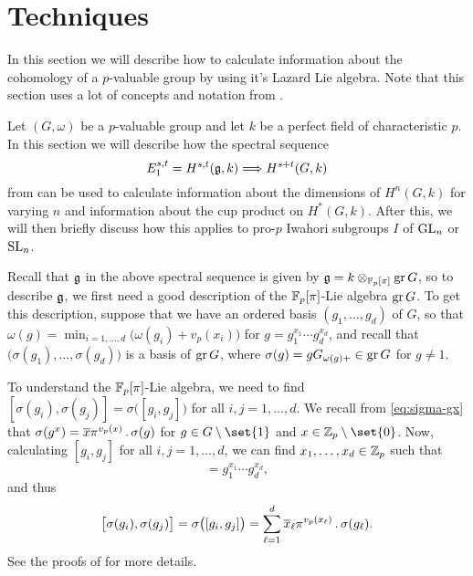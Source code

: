 \section{Techniques}%
\label{sec:tech-iwa}

In this section we will describe how to calculate information about the cohomology of a $p$-valuable group by using it's Lazard Lie algebra. Note that this section uses a lot of concepts and notation from .

Let $(G, \omega)$ be a $p$-valuable group and let $k$ be a perfect field of characteristic $p$. In this section we will describe how the spectral sequence
\begin{equation}\label{eq:spec-sec-tech}
  E_{1}^{s,t} = H^{s,t}(\mathfrak{g}, k) \Longrightarrow H^{s+t}(G, k)
\end{equation}
from \cite[§6.1]{Sor} can be used to calculate information about the dimensions of $H^{n}(G,k)$ for varying $n$ and information about the cup product on $H^{*}(G,k)$. After this, we will then briefly discuss how this applies to pro-$p$ Iwahori subgroups $I$ of $\operatorname{GL}_{n}$ or $\operatorname{SL}_{n}$.

Recall that $\mathfrak{g}$ in the above spectral sequence is given by $\mathfrak{g} = k \otimes_{\mathbb{F}_{p}[\pi]} \operatorname{gr} G$, so to describe $\mathfrak{g}$, we first need a good description of the $\mathbb{F}_{p}[\pi]$-Lie algebra $\operatorname{gr} G$. To get this description, suppose that we have an ordered basis $(g_{1},\dotsc,g_{d})$ of $G$, so that $\omega(g) = \min_{i = 1,\dotsc,d} \bigl( \omega(g_{i}) + v_{p}(x_{i}) \bigr)$ for $g = g_{1}^{x_{1}} \dotsb g_{d}^{x_{d}}$, and recall that $\bigl( \sigma(g_{1}),\dotsc,\sigma(g_{d}) \bigr)$ is a basis of $\operatorname{gr} G$, where $\sigma(g) = gG_{\omega(g)+} \in \operatorname{gr} G$ for $g \neq 1$.

To understand the $\mathbb{F}_{p}[\pi]$-Lie algebra, we need to find $[\sigma(g_{i}),\sigma(g_{j})] = \sigma\bigl( [g_{i},g_{j}] \bigr)$ for all $i,j = 1,\dotsc,d$. We recall from \eqref{eq:sigma-gx} that $\sigma(g^{x}) = \overline{x}\pi^{v_{p}(x)} \,.\, \sigma(g)$ for $g \in G \setminus\set{1}$ and $x \in \Z_{p}\setminus\set{0}$. Now, calculating $[g_{i},g_{j}]$ for all $i,j = 1,\dotsc,d$, we can find $x_{1},\dotsc,x_{d} \in \mathbb{Z}_{p}$ such that
\begin{equation*}
  [g_{i},g_{j}] = g_{1}^{x_{1}} \dotsb g_{d}^{x_{d}},
\end{equation*}
and thus
\begin{equation*}
  \bigl[ \sigma(g_{i}),\sigma(g_{j}) \bigr] = \sigma\bigl( [g_{i},g_{j}] \bigr) = \sum_{\ell=1}^{d} \overline{x}_{\ell}\pi^{v_{p}(x_{\ell})} \,.\, \sigma(g_{\ell}).
\end{equation*}
See the proofs of \cite[Lem.~26.4 and Prop.~26.5]{Sch} for more details.

